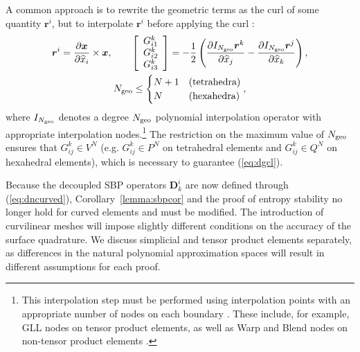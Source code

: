 \documentclass[review]{siamart0216}
\theoremstyle{assumption}
\renewcommand{\hat}[1]{\hat{#1}}
\newcommand{\pd}[2]{\frac{\partial#1}{\partial#2}}
\newcommand{\LRp}[1]{\left( #1 \right)}
\newcommand{\LRs}[1]{\left[ #1 \right]}
\renewcommand{\hat}{\widehat}
\begin{document}
A common approach is to rewrite the geometric terms as the curl of some quantity $\bm{r}^i$, but to interpolate $\bm{r}^i$ before applying the curl \cite{visbal2002use, kopriva2006metric, hindenlang2012explicit, chan2018discretely}:
\begin{gather}
\bm{r}^i = { \pd{\bm{x}}{\hat{x}_i}\times \bm{x}}, \qquad
\LRs{\begin{array}{c}
{G}^k_{i1}\\
{G}^k_{i2}\\
{G}^k_{i3}\end{array}} = -\frac{1}{2}\LRp{\pd{I_{N_{\rm geo}}\bm{r}^k}{\hat{x}_j}-\pd{I_{N_{\rm geo}}\bm{r}^j}{\hat{x}_k}},\\
N_{\rm geo} \leq \begin{cases}
N+1 & \text{(tetrahedra)}\\
N & \text{(hexahedra)}
\end{cases},\nonumber
\label{eq:iconscurl}
\end{gather}
where $I_{N_{\rm geo}}$ denotes a degree $N_{\rm geo}$ polynomial interpolation operator with appropriate interpolation nodes.\footnote{This interpolation step must be performed using interpolation points with an appropriate number of nodes on each boundary \cite{chan2018discretely}.  These include, for example, GLL nodes on tensor product elements, as well as Warp and Blend nodes on non-tensor product elements \cite{warburton2006explicit, chan2015comparison}.}  The restriction on the maximum value of $N_{\rm geo}$ ensures that $G^k_{ij} \in V^N$ (e.g. $G^k_{ij} \in P^N$ on tetrahedral elements and $G^k_{ij}\in Q^N$ on hexahedral elements), which is necessary to guarantee (\ref{eq:dgcl}).

Because the decoupled SBP operators $\bm{D}^i_k$ are now defined through (\ref{eq:dncurved}), Corollary~\ref{lemma:sbpcor} and the proof of entropy stability no longer hold for curved elements and must be modified.  The introduction of curvilinear meshes will impose slightly different conditions on the accuracy of the surface quadrature.  We discuss simplicial and tensor product elements separately, as differences in the natural polynomial approximation spaces will result in different assumptions for each proof.
\end{document}

